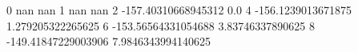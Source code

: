 0 nan nan
1 nan nan
2 -157.40310668945312 0.0
4 -156.1239013671875 1.279205322265625
6 -153.56564331054688 3.83746337890625
8 -149.41847229003906 7.9846343994140625
